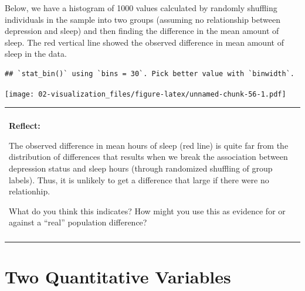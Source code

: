 \documentclass[
]{book}
\newenvironment{Shaded}{\begin{snugshade}}{\end{snugshade}}
\newcommand{\DataTypeTok}[1]{\textcolor[rgb]{0.13,0.29,0.53}{#1}}
\newcommand{\KeywordTok}[1]{\textcolor[rgb]{0.13,0.29,0.53}{\textbf{#1}}}
\newcommand{\NormalTok}[1]{#1}
\newcommand{\OperatorTok}[1]{\textcolor[rgb]{0.81,0.36,0.00}{\textbf{#1}}}
\newcommand{\StringTok}[1]{\textcolor[rgb]{0.31,0.60,0.02}{#1}}
\newenvironment{reflect}
{
    \begin{center}
    
    \begin{tabular}{|p{0.8\textwidth}|}
    \rowcolor{LightBlue}
    \hline\\
    \rowcolor{LightBlue}
    \textbf{Reflect:}
}
{
    \\\rowcolor{LightBlue}
    \\\hline
    \end{tabular} 
    \end{center}
}
\begin{document}
Below, we have a histogram of 1000 values calculated by randomly shuffling individuals in the sample into two groups (assuming no relationship between depression and sleep) and then finding the difference in the mean amount of sleep. The red vertical line showed the observed difference in mean amount of sleep in the data.

\begin{Shaded}
\end{Shaded}

\begin{verbatim}
## `stat_bin()` using `bins = 30`. Pick better value with `binwidth`.
\end{verbatim}

\texttt{[image: 02-visualization\_files/figure-latex/unnamed-chunk-56-1.pdf]}

\begin{reflect}
The observed difference in mean hours of sleep (red line) is quite far
from the distribution of differences that results when we break the
association between depression status and sleep hours (through
randomized shuffling of group labels). Thus, it is unlikely to get a
difference that large if there were no relationhip.

What do you think this indicates? How might you use this as evidence for
or against a ``real'' population difference?
\end{reflect}

\hypertarget{two-quantitative-variables}{%
\section{Two Quantitative Variables}\label{two-quantitative-variables}}
\end{document}
